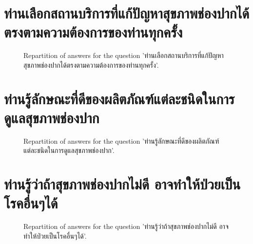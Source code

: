 \documentclass[12pt]{article}
\begin{document}
\clearpage{}
\section{ท่านเลือกสถานบริการที่แก้ปัญหาสุขภาพช่องปากได้ตรงตามความต้องการของท่านทุกครั้ง}

\label{sec:99}


\begin{figure}[h!]
    \caption{\label{figure:q99-1}Repartition of answers for the question 'ท่านเลือกสถานบริการที่แก้ปัญหาสุขภาพช่องปากได้ตรงตามความต้องการของท่านทุกครั้ง'.}
\end{figure}



\clearpage{}
\section{ท่านรู้ลักษณะที่ดีของผลิตภัณฑ์แต่ละชนิดในการดูแลสุขภาพช่องปาก}

\label{sec:100}


\begin{figure}[h!]
    \caption{\label{figure:q100-1}Repartition of answers for the question 'ท่านรู้ลักษณะที่ดีของผลิตภัณฑ์แต่ละชนิดในการดูแลสุขภาพช่องปาก'.}
\end{figure}



\clearpage{}
\section{ท่านรู้ว่าถ้าสุขภาพช่องปากไม่ดี อาจทำให้ป่วยเป็นโรคอื่นๆได้}

\label{sec:101}


\begin{figure}[h!]
    \caption{\label{figure:q101-1}Repartition of answers for the question 'ท่านรู้ว่าถ้าสุขภาพช่องปากไม่ดี อาจทำให้ป่วยเป็นโรคอื่นๆได้'.}
\end{figure}
\end{document}
